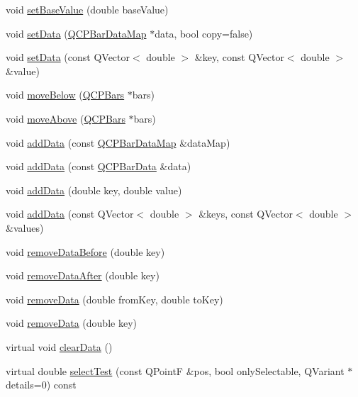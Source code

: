\begin{DoxyCompactItemize}
\item 
void \hyperlink{class_q_c_p_bars_a574ec7eb7537566df1a28ff085d75623}{set\+Base\+Value} (double base\+Value)
\item 
void \hyperlink{class_q_c_p_bars_aa3435aab19e0a49e4e7b41bd36a8d96b}{set\+Data} (\hyperlink{qcustomplot_8h_aa846c77472cae93def9f1609d0c57191}{Q\+C\+P\+Bar\+Data\+Map} $\ast$data, bool copy=false)
\item 
void \hyperlink{class_q_c_p_bars_a3efded5df4a82ecb201f7c28099fa2e5}{set\+Data} (const Q\+Vector$<$ double $>$ \&key, const Q\+Vector$<$ double $>$ \&value)
\item 
void \hyperlink{class_q_c_p_bars_a69fc371346980f19177c3d1ecdad78ee}{move\+Below} (\hyperlink{class_q_c_p_bars}{Q\+C\+P\+Bars} $\ast$bars)
\item 
void \hyperlink{class_q_c_p_bars_ac22e00a6a41509538c21b04f0a57318c}{move\+Above} (\hyperlink{class_q_c_p_bars}{Q\+C\+P\+Bars} $\ast$bars)
\item 
void \hyperlink{class_q_c_p_bars_a1f29cf08615040993209147fa68de3f2}{add\+Data} (const \hyperlink{qcustomplot_8h_aa846c77472cae93def9f1609d0c57191}{Q\+C\+P\+Bar\+Data\+Map} \&data\+Map)
\item 
void \hyperlink{class_q_c_p_bars_a142158b1addefd53259002dd3ab22c3a}{add\+Data} (const \hyperlink{class_q_c_p_bar_data}{Q\+C\+P\+Bar\+Data} \&data)
\item 
void \hyperlink{class_q_c_p_bars_a684dd105403a5497fda42f2094fecbb7}{add\+Data} (double key, double value)
\item 
void \hyperlink{class_q_c_p_bars_a3679a0a9decab0fa03f8f4c6e3344d52}{add\+Data} (const Q\+Vector$<$ double $>$ \&keys, const Q\+Vector$<$ double $>$ \&values)
\item 
void \hyperlink{class_q_c_p_bars_a9d12779a3fad4820aad2c428f368298d}{remove\+Data\+Before} (double key)
\item 
void \hyperlink{class_q_c_p_bars_a99de6e7abbbf03fb41fa604c7f08aa8b}{remove\+Data\+After} (double key)
\item 
void \hyperlink{class_q_c_p_bars_a1fe9bcb57d670defea1bb65cadf43765}{remove\+Data} (double from\+Key, double to\+Key)
\item 
void \hyperlink{class_q_c_p_bars_a837cc9848ad3edd40a6130b508493f93}{remove\+Data} (double key)
\item 
virtual void \hyperlink{class_q_c_p_bars_a11dbbd707132f07f862dff13c5789c2b}{clear\+Data} ()
\item 
virtual double \hyperlink{class_q_c_p_bars_a62d66cc8eedca6bedfc1f6513164d418}{select\+Test} (const Q\+PointF \&pos, bool only\+Selectable, Q\+Variant $\ast$details=0) const
\end{DoxyCompactItemize}
